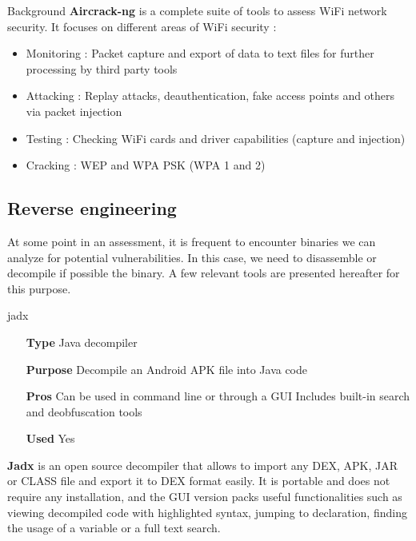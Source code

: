 \begin{chaptercover}{Background}
\textbf{Aircrack-ng} \cite{aircrack-ng} is a complete suite of tools to assess WiFi network security. It focuses on different areas of WiFi security :
\begin{itemize}[itemsep=0.1cm,topsep=0.1cm]
  \item Monitoring : Packet capture and export of data to text files for further processing by third party tools
  \item Attacking : Replay attacks, deauthentication, fake access points and others via packet injection
  \item Testing : Checking WiFi cards and driver capabilities (capture and injection)
  \item Cracking : WEP and WPA PSK (WPA 1 and 2)
\end{itemize}

\subsection{Reverse engineering}

At some point in an assessment, it is frequent to encounter binaries we can analyze for potential vulnerabilities. In this case, we need to disassemble or decompile if possible the binary. A few relevant tools are presented hereafter for this purpose.

\begin{solutiondata}{jadx}
\begin{itemize}[labelsep=1cm]
  \item [\textbf{Type}] Java decompiler
  \item [\textbf{Purpose}] Decompile an Android APK file into Java code
  \item [\textbf{Pros}] Can be used in command line or through a GUI \newline Includes built-in search and deobfuscation tools
  \item [\textbf{Used}] Yes
\end{itemize}
\end{solutiondata}

\textbf{Jadx} \cite{jadx} is an open source decompiler that allows to import any DEX, APK, JAR or CLASS file and export it to DEX format easily. It is portable and does not require any installation, and the GUI version packs useful functionalities such as viewing decompiled code with highlighted syntax, jumping to declaration, finding the usage of a variable or a full text search.


\end{chaptercover}
